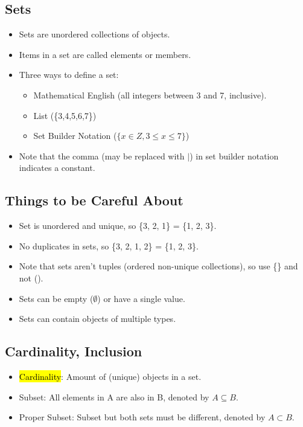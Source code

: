 \subsection{Sets}
\begin{itemize}
    \item Sets are unordered collections of objects.
    \item Items in a set are called elements or members.
    \item Three ways to define a set: \begin{itemize}
        \item Mathematical English (all integers between 3 and 7, inclusive).
        \item List (\{3,4,5,6,7\})
        \item Set Builder Notation ($\{x\in Z, 3\leq x \leq 7\}$)
    \end{itemize}
    \item Note that the comma (may be replaced with $|$) in set builder notation indicates a constant.
\end{itemize}

\subsection{Things to be Careful About}
\begin{itemize}
    \item Set is unordered and unique, so \{3, 2, 1\} = \{1, 2, 3\}.
    \item No duplicates in sets, so \{3, 2, 1, 2\} = \{1, 2, 3\}.
    \item Note that sets aren't tuples (ordered non-unique collections), so use \{\} and not ().
    \item Sets can be empty ($\emptyset$) or have a single value.
    \item Sets can contain objects of multiple types.
\end{itemize}

\subsection{Cardinality, Inclusion}
\begin{itemize}
    \item \hl{Cardinality}: Amount of (unique) objects in a set.
    \item Subset: All elements in A are also in B, denoted by $A \subseteq B$.
    \item Proper Subset: Subset but both sets must be different, denoted by $ A \subset B$.
\end{itemize}

